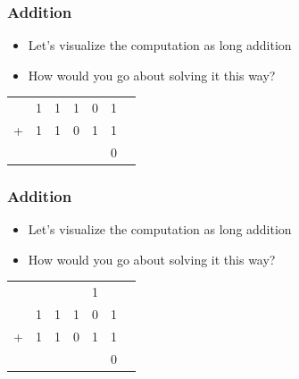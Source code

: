 \documentclass{beamer}
\begin{document}
		\begin{frame}
    		\frametitle{Addition}
    		\begin{itemize}
    			\item Let's visualize the computation as long addition
    			\item How would you go about solving it this way?
			\end{itemize}
			
			\centering
			{\LARGE
			\begin{tabular}{c@{\,}c@{\,}c@{\,}c@{\,}c@{\,}c@{\,}c}
					   & 1 & 1 & 1 & 0 & 1 \\
					 + & 1 & 1 & 0 & 1 & 1 \\
					\hline
					& & & & & 0
					
			\end{tabular}}
		\end{frame}
		
		\begin{frame}
    		\frametitle{Addition}
    		\begin{itemize}
    			\item Let's visualize the computation as long addition
    			\item How would you go about solving it this way?
			\end{itemize}
			
			\centering
			{\LARGE
			\begin{tabular}{c@{\,}c@{\,}c@{\,}c@{\,}c@{\,}c@{\,}c}
					   &   &   &   & {\color{red}1} &   \\
					   & 1 & 1 & 1 & 0 & 1 \\
					 + & 1 & 1 & 0 & 1 & 1 \\
					\hline
					   &   &   &   &   & 0
					
			\end{tabular}}
			
			
		\end{frame}	
		
\end{document}
